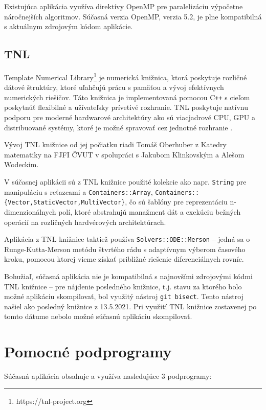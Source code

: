Existujúca aplikácia využíva direktívy OpenMP pre paralelizáciu výpočetne náročnejších algoritmov. Súčasná verzia OpenMP, verzia 5.2, je plne kompatibilná s aktuálnym zdrojovým kódom aplikácie.

\subsection {TNL}\label{tnl}
Template Numerical Library\footnote{https://tnl-project.org} je numerická knižnica, ktorá poskytuje rozličné dátové štruktúry, ktoré uľahčujú prácu s pamäťou a vývoj efektívnych numerických riešičov. Táto knižnica je implementovaná pomocou C\texttt{++} s cieľom poskytnúť flexibilné a užívateľsky prívetivé rozhranie. TNL poskytuje natívnu podporu pre moderné hardwarové architektúry ako sú viacjadrové CPU, GPU a distribuované systémy, ktoré je možné spravovať cez jednotné rozhranie \cite{tnl_description}.

Vývoj TNL knižnice od jej počiatku riadi Tomáš Oberhuber z Katedry matematiky na FJFI ČVUT v spolupráci s Jakubom Klinkovským a Alešom Wodeckim.

V súčasnej aplikácii sú z TNL knižnice použité kolekcie ako napr. \texttt{String} pre manipuláciu s reťazcami a \texttt{Containers::Array}, \texttt{Containers::\{Vector,\newline StaticVector,MultiVector\}}, čo sú šablóny pre reprezentáciu \newline n-dimenzionálnych polí, ktoré abstrahujú manažment dát a exekúciu bežných operácií na rozličných hardvérových architektúrach.

Aplikácia z TNL knižnice taktiež používa \texttt{Solvers::ODE::Merson} -- jedná sa o Runge-Kutta-Merson metódu štvrtého rádu s adaptívnym výberom časového kroku, pomocou ktorej vieme získať približné riešenie diferenciálnych rovníc.

Bohužiaľ, súčasná aplikácia nie je kompatibilná s najnovšími zdrojovými kódmi TNL knižnice -- pre nájdenie posledného  knižnice, t.j. stavu za ktorého bolo možné aplikáciu skompilovať, bol využitý nástroj \texttt{git bisect}. Tento nástroj našiel ako posledný  knižnice z 13.5.2021. Pri využití TNL knižnice zostavenej po tomto dátume nebolo možné súčasnú aplikáciu skompilovať.

\section {Pomocné podprogramy}\label{helper_apps}
Súčasná aplikácia obsahuje a využíva nasledujúce 3 podprogramy:

